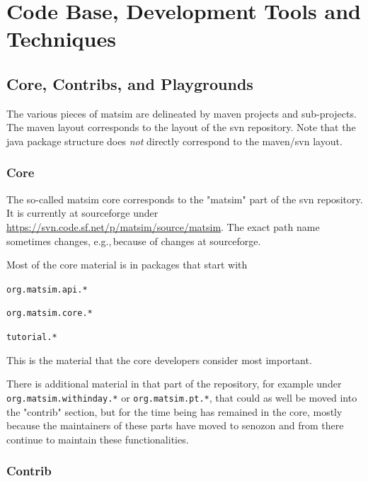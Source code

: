 \section{Code Base, Development Tools and Techniques}

\subsection{Core, Contribs, and Playgrounds}

The various pieces of \gls{matsim} are delineated by \gls{maven} projects and sub-projects.  The \gls{maven} layout corresponds to the layout of the \gls{svn} repository.  Note that the \gls{java} package structure does \emph{not} directly correspond to the \gls{maven}/\gls{svn} layout.

\subsubsection{Core}

The so-called \gls{matsim} core corresponds to the "matsim" part of the \gls{svn} repository.  It is currently at \gls{sourceforge} under \url{https://svn.code.sf.net/p/matsim/source/matsim}. The exact path name sometimes changes, e.g.,\,because of changes at \gls{sourceforge}.

Most of the core material is in packages that start with
\begin{compactitem}
\item \lstinline{org.matsim.api.*}
\item \lstinline{org.matsim.core.*}
\item \lstinline{tutorial.*}
\end{compactitem}
This is the material that the core developers consider most important. 

There is additional material in that part of the repository, for example under \lstinline{org.matsim.withinday.*} or \lstinline{org.matsim.pt.*}, that could as well be moved into the "contrib" section, but for the time being has remained in the core, mostly because the maintainers of these parts have moved to \gls{senozon} and from there continue to maintain these functionalities.

\subsubsection{Contrib}

